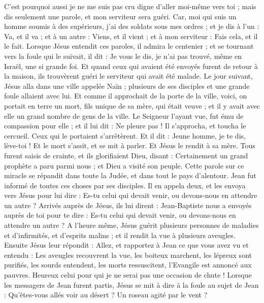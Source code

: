\begin{multicols}{2}
C'est pourquoi aussi je ne me suis pas cru digne d'aller moi-même vers toi ; mais dis seulement une parole, et mon serviteur sera guéri.
Car, moi qui suis un homme soumis à des supérieurs, j'ai des soldats sous mes ordres ; et je dis à l'un : Va, et il va ; et à un autre : Viens, et il vient ; et à mon serviteur : Fais cela, et il le fait.
Lorsque Jésus entendit ces paroles, il admira le centenier ; et se tournant vers la foule qui le suivait, il dit : Je vous le dis, je n'ai pas trouvé, même en Israël, une si grande foi.
Et quand ceux qui avaient été envoyés furent de retour à la maison, ils trouvèrent guéri le serviteur qui avait été malade.
Le jour suivant, Jésus alla dans une ville appelée Naïn ; plusieurs de ses disciples et une grande foule allaient avec lui.
Et comme il approchait de la porte de la ville, voici, on portait en terre un mort, fils unique de sa mère, qui était veuve ; et il y avait avec elle un grand nombre de gens de la ville.
Le Seigneur l'ayant vue, fut ému de compassion pour elle ; et il lui dit : Ne pleure pas !
Il s'approcha, et toucha le cercueil. Ceux qui le portaient s'arrêtèrent. Et il dit : Jeune homme, je te dis, lève-toi !
Et le mort s'assit, et se mit à parler. Et Jésus le rendit à sa mère.
Tous furent saisis de crainte, et ils glorifiaient Dieu, disant : Certainement un grand prophète a paru parmi nous ; et Dieu a visité son peuple.
Cette parole sur ce miracle se répandit dans toute la Judée, et dans tout le pays d'alentour.
Jean fut informé de toutes ces choses par ses disciples.
Il en appela deux, et les envoya vers Jésus pour lui dire : Es-tu celui qui devait venir, ou devons-nous en attendre un autre ?
Arrivés auprès de Jésus, ils lui dirent : Jean-Baptiste nous a envoyés auprès de toi pour te dire : Es-tu celui qui devait venir, ou devons-nous en attendre un autre ?
A l'heure même, Jésus guérit plusieurs personnes de maladies et d'infirmités, et d'esprits malins ; et il rendit la vue à plusieurs aveugles.
Ensuite Jésus leur répondit : Allez, et rapportez à Jean ce que vous avez vu et entendu : Les aveugles recouvrent la vue, les boiteux marchent, les lépreux sont purifiés, les sourds entendent, les morts ressuscitent, l'Evangile est annoncé aux pauvres.
Heureux celui pour qui je ne serai pas une occasion de chute !
Lorsque les messagers de Jean furent partis, Jésus se mit à dire à la foule au sujet de Jean : Qu'êtes-vous allés voir au désert ? Un roseau agité par le vent ?

\end{multicols}
